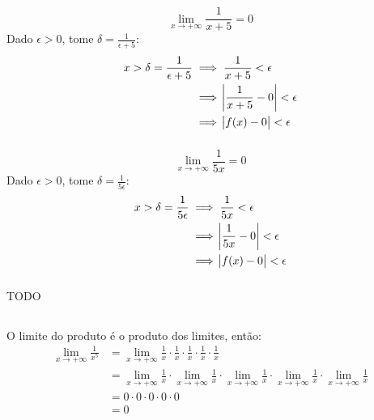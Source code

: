 \documentclass[12pt]{article}
\theoremstyle{definition}
\begin{document}
\section{}
\subsection{}
\subsubsection{}
\[
	\lim_{x\rightarrow +\infty} \frac{1}{x+5} = 0
\]
Dado \(\epsilon > 0\), tome \(\delta = \frac{1}{\epsilon +5}\):
\begin{align*}
	x > \delta = \frac{1}{\epsilon+5}
	&\implies \frac{1}{x+5} < \epsilon \\
	&\implies \abs{\frac{1}{x+5} - 0} < \epsilon \\
	&\implies \abs{f(x) - 0} < \epsilon
\end{align*}
\subsubsection{}
\[
	\lim_{x\rightarrow +\infty} \frac{1}{5x} = 0
\]
Dado \(\epsilon > 0\), tome \(\delta = \frac{1}{5\epsilon}\):
\begin{align*}
	x > \delta = \frac{1}{5\epsilon}
	&\implies \frac{1}{5x} < \epsilon \\
	&\implies \abs{\frac{1}{5x} - 0} < \epsilon \\
	&\implies \abs{f(x) - 0} < \epsilon
\end{align*}
\subsubsection{}
TODO

\subsection{}
\subsubsection{}
O limite do produto é o produto dos limites, então:
\begin{align*}
	\lim_{x\rightarrow + \infty} \frac{1}{x^5}
	&= \lim_{x\rightarrow + \infty} \frac{1}{x} \cdot \frac{1}{x} \cdot \frac{1}{x}  \cdot \frac{1}{x}  \cdot \frac{1}{x} \\
	&= \lim_{x\rightarrow +\infty} \frac{1}{x} \cdot \lim_{x\rightarrow +\infty} \frac{1}{x} \cdot \lim_{x\rightarrow +\infty} \frac{1}{x} \cdot \lim_{x\rightarrow +\infty} \frac{1}{x} \cdot \lim_{x\rightarrow +\infty} \frac{1}{x} \\
	&= 0 \cdot 0 \cdot 0 \cdot 0 \cdot 0 \\ 
	&= 0
\end{align*}
\end{document}
